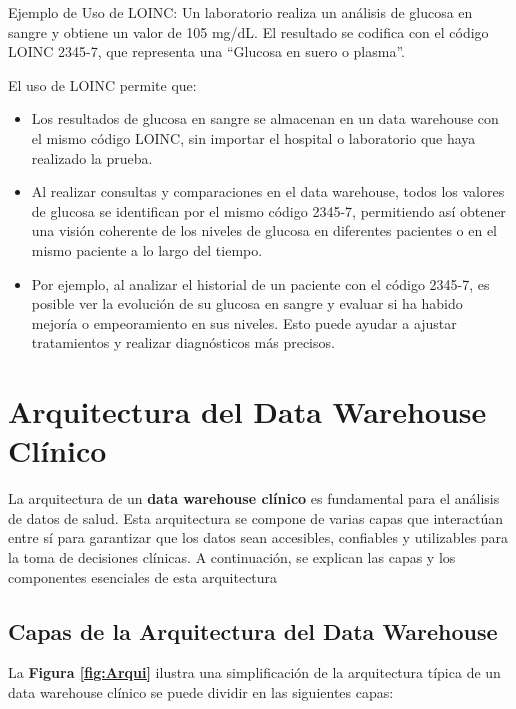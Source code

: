 \documentclass[12pt, a4paper, twoside]{article}
\begin{document}
	Ejemplo de Uso de LOINC: Un laboratorio realiza un análisis de glucosa en sangre y obtiene un valor de 105 mg/dL. El resultado se codifica con el código LOINC 2345-7, que representa una “Glucosa en suero o plasma”\cite{loinc2345}.
	
	
	El uso de LOINC permite que:
	\begin{itemize}
		\item Los resultados de glucosa en sangre se almacenan en un data warehouse con el mismo código LOINC, sin importar el hospital o laboratorio que haya realizado la prueba.
		
		\item Al realizar consultas y comparaciones en el data warehouse, todos los valores de glucosa se identifican por el mismo código 2345-7, permitiendo así obtener una visión coherente de los niveles de glucosa en diferentes pacientes o en el mismo paciente a lo largo del tiempo.
		
		\item Por ejemplo, al analizar el historial de un paciente con el código 2345-7, es posible ver la evolución de su glucosa en sangre y evaluar si ha habido mejoría o empeoramiento en sus niveles. Esto puede ayudar a ajustar tratamientos y realizar diagnósticos más precisos.
	\end{itemize}
	
	
	
	\section{Arquitectura del Data Warehouse Clínico}
	
	La arquitectura de un \textbf{data warehouse clínico} es fundamental para el análisis de datos de salud. Esta arquitectura se compone de varias capas que interactúan entre sí para garantizar que los datos sean accesibles, confiables y utilizables para la toma de decisiones clínicas. A continuación, se explican las capas y los componentes esenciales de esta arquitectura
	
	\subsection{Capas de la Arquitectura del Data Warehouse}

	La \textbf{Figura \ref{fig:Arqui}} ilustra una simplificación de la arquitectura típica de un data warehouse clínico se puede dividir en las siguientes capas:
	
\end{document}
